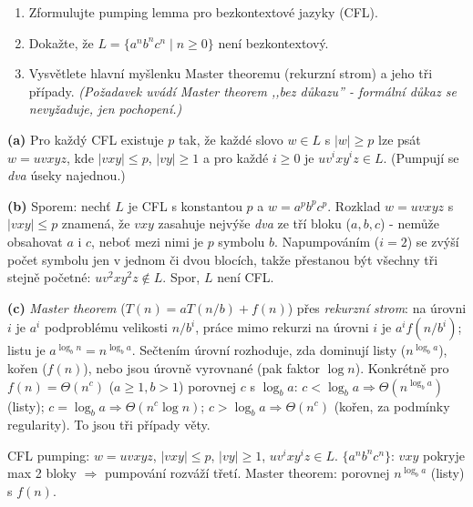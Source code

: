 \begin{zadani}
\begin{enumerate}[label=(\alph*)]
  \item {} Zformulujte pumping lemma pro bezkontextové jazyky (CFL).
  \item {} Dokažte, že $L=\{a^n b^n c^n\mid n\ge0\}$ není bezkontextový.
  \item {} Vysvětlete hlavní myšlenku Master theoremu (rekurzní strom) a jeho tři případy. \emph{(Požadavek uvádí Master theorem ,,bez důkazu'' - formální důkaz se nevyžaduje, jen pochopení.)}
\end{enumerate}
\end{zadani}

\begin{reseni}
\textbf{(a)} Pro každý CFL existuje $p$ tak, že každé slovo $w\in L$ s $|w|\ge p$ lze psát $w=uvxyz$, kde $|vxy|\le p$, $|vy|\ge1$ a pro každé $i\ge0$ je $uv^ixy^iz\in L$. (Pumpují se \emph{dva} úseky najednou.)

\textbf{(b)} Sporem: nechť $L$ je CFL s konstantou $p$ a $w=a^pb^pc^p$. Rozklad $w=uvxyz$ s $|vxy|\le p$ znamená, že $vxy$ zasahuje nejvýše \emph{dva} ze tří bloku ($a,b,c$) - nemůže obsahovat $a$ i $c$, neboť mezi nimi je $p$ symbolu $b$. Napumpováním ($i=2$) se zvýší počet symbolu jen v jednom či dvou blocích, takže přestanou být všechny tři stejně početné: $uv^2xy^2z\notin L$. Spor, $L$ není CFL.

\textbf{(c)} \emph{Master theorem} ($T(n)=aT(n/b)+f(n)$) přes \emph{rekurzní strom}: na úrovni $i$ je $a^i$ podproblému velikosti $n/b^i$, práce mimo rekurzi na úrovni $i$ je $a^i f(n/b^i)$; listu je $a^{\log_b n}=n^{\log_b a}$. Sečtením úrovní rozhoduje, zda dominují listy ($n^{\log_b a}$), kořen ($f(n)$), nebo jsou úrovně vyrovnané (pak faktor $\log n$). Konkrétně pro $f(n)=\Theta(n^c)$ ($a\ge1,b>1$) porovnej $c$ s $\log_b a$: $c<\log_b a\Rightarrow\Theta(n^{\log_b a})$ (listy); $c=\log_b a\Rightarrow\Theta(n^{c}\log n)$; $c>\log_b a\Rightarrow\Theta(n^{c})$ (kořen, za podmínky regularity). To jsou tři případy věty.
\end{reseni}

\begin{jadro}
CFL pumping: $w=uvxyz$, $|vxy|\le p$, $|vy|\ge1$, $uv^ixy^iz\in L$. $\{a^nb^nc^n\}$: $vxy$ pokryje max 2 bloky $\Rightarrow$ pumpování rozváží třetí. Master theorem: porovnej $n^{\log_b a}$ (listy) s $f(n)$.
\end{jadro}

